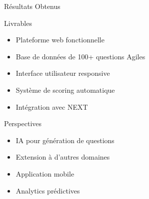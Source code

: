\documentclass[aspectratio=169]{beamer}
\begin{document}
\begin{frame}{Résultats Obtenus}
    \begin{block}{Livrables}
        \begin{itemize}
            \item Plateforme web fonctionnelle
            \item Base de données de 100+ questions Agiles
            \item Interface utilisateur responsive
            \item Système de scoring automatique
            \item Intégration avec NEXT
        \end{itemize}
    \end{block}

    \begin{block}{Perspectives}
        \begin{itemize}
            \item IA pour génération de questions
            \item Extension à d'autres domaines
            \item Application mobile
            \item Analytics prédictives
        \end{itemize}
    \end{block}
\end{frame}
\end{document}
